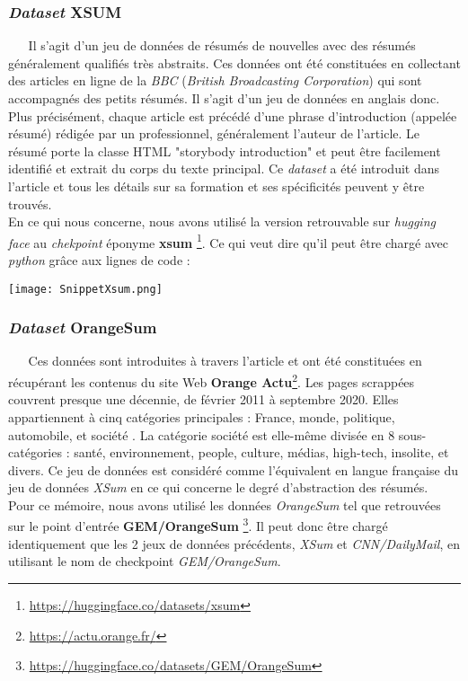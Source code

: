 \subsubsection{\textit{Dataset} XSUM}
$ _{} $ $ _{} $ $ _{} $ $ _{} $ $ _{} $Il s'agit d'un jeu de données de résumés de nouvelles avec des résumés gé\-né\-ra\-le\-ment qualifiés très abstraits. Ces données ont été constituées en collectant des articles en ligne de la \textit{BBC} (\textit{British Broadcasting Corporation}) qui sont accompagnés des petits résumés. Il s'agit d'un jeu de données en anglais donc. Plus précisément, chaque article est précédé d'une phrase d'introduction (appelée résumé) rédigée par un professionnel, généralement l'auteur de l'article. Le résumé porte la classe HTML "storybody introduction" et peut être facilement identifié et extrait du corps du texte principal. Ce \textit{dataset} a été introduit dans l'article \cite{XSumArticle} et tous les détails sur sa formation et ses spécificités peuvent y être trouvés.\\
En ce qui nous concerne, nous avons utilisé la version retrouvable sur \textit{hugging face} au \textit{chekpoint} éponyme \textbf{xsum} \footnote{\href{https://huggingface.co/datasets/xsum}{https://huggingface.co/datasets/xsum}}. Ce qui veut dire qu'il peut être chargé avec \textit{python} grâce aux lignes de code :
\begin{center}
\texttt{[image: SnippetXsum.png]}
\end{center}
\subsubsection{\textit{Dataset} OrangeSum}
$ _{} $ $ _{} $ $ _{} $ $ _{} $ $ _{} $Ces données sont introduites à travers l'article \cite{eddine2020barthez} et ont été constituées en récupérant les contenus du site Web \textbf{Orange Actu}\footnote{\href{https://actu.orange.fr/}{https://actu.orange.fr/}}. Les pages scrappées couvrent presque une décennie, de février 2011 à septembre 2020. Elles appartiennent à cinq catégories prin\-ci\-pa\-les : France, monde, politique, automobile, et société . La catégorie société est elle-même divisée en 8 sous-catégories : santé, environnement, people, culture, médias, high-tech, insolite, et divers. Ce jeu de données est considéré comme l'équivalent en langue française du jeu de données \textit{XSum} en ce qui concerne le degré d'abstraction des résumés.\\
Pour ce mémoire, nous avons utilisé les données \textit{OrangeSum} tel que retrouvées sur le point d'entrée \textbf{GEM/OrangeSum} \footnote{\href{https://huggingface.co/datasets/GEM/OrangeSum}{https://huggingface.co/datasets/GEM/OrangeSum}}. Il peut donc être chargé identiquement que les 2 jeux de données précédents, \textit{XSum} et \textit{CNN/DailyMail}, en utilisant le nom de checkpoint \textit{GEM/OrangeSum}.
